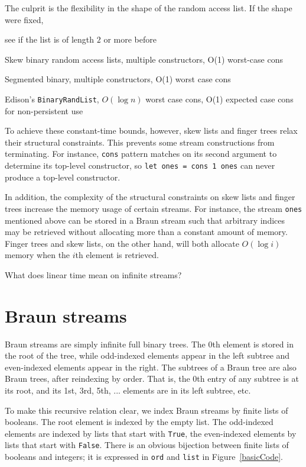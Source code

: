\documentclass{llncs}
\begin{document}
The culprit is the flexibility in the shape of the random access list.
If the shape were fixed, 


see if the list is of length $2$ or more before 

Skew binary random access lists, multiple constructors, O(1) worst-case cons \cite{okasakiSkewLists}

Segmented binary, multiple constructors, O(1) worst case cons \cite{okasakiThesis}

Edison's \verb|BinaryRandList|, $O(\log n)$ worst case cons, O(1) expected case cons for non-persistent use \cite{holtersThesis}

To achieve these constant-time bounds, however, skew lists and finger trees relax their structural constraints. 
This prevents some stream constructions from terminating. 
For instance, \verb|cons| pattern matches on its second argument to determine its top-level constructor, so \verb|let ones = cons 1 ones| can never produce a top-level constructor.

In addition, the complexity of the structural constraints on skew lists and finger trees increase the memory usage of certain streams.
For instance, the stream \verb|ones| mentioned above can be stored in a Braun stream such that arbitrary indices may be retrieved without allocating more than a constant amount of memory.
Finger trees and skew lists, on the other hand, will both allocate $O(\log i)$ memory when the $i$th element is retrieved.

What does linear time mean on infinite streams?

\section{Braun streams}

Braun streams are simply infinite full binary trees.
The $0$th element is stored in the root of the tree, while odd-indexed elements appear in the left subtree and even-indexed elements appear in the right.
The subtrees of a Braun tree are also Braun trees, after reindexing by order.
That is, the 0th entry of any subtree is at its root, and its 1st, 3rd, 5th, ... elements are in its left subtree, etc.

To make this recursive relation clear, we index Braun streams by finite lists of booleans.
The root element is indexed by the empty list.
The odd-indexed elements are indexed by lists that start with \verb|True|, the even-indexed elements by lists that start with \verb|False|.
There is an obvious bijection between finite lists of booleans and integers;
it is expressed in \verb|ord| and \verb|list| in Figure~\ref{basicCode}.
\end{document}
